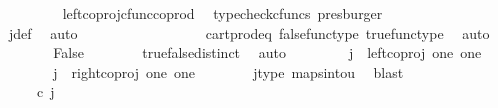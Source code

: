 \begin{isabellebody}
\ \ \ \ \ \ \isamarkupfalse%
\ \ left{\isacharunderscore}{\kern0pt}coproj{\isacharunderscore}{\kern0pt}cfunc{\isacharunderscore}{\kern0pt}coprod\ \isamarkupfalse%
\ {\isacharparenleft}{\kern0pt}typecheck{\isacharunderscore}{\kern0pt}cfuncs{\isacharcomma}{\kern0pt}\ presburger{\isacharparenright}{\kern0pt}\isanewline
\ \ \ \ \isamarkupfalse%
\ \isamarkupfalse%
\ {\isachardoublequoteopen}{\isasymlangle}{\isasymf}{\isacharcomma}{\kern0pt}{\isasymt}{\isasymrangle}\ {\isacharequal}{\kern0pt}\ {\isasymlangle}{\isasymt}{\isacharcomma}{\kern0pt}{\isasymt}{\isasymrangle}{\isachardoublequoteclose}\isanewline
\ \ \ \ \ \ \isamarkupfalse%
\ j{\isacharunderscore}{\kern0pt}def\ \isamarkupfalse%
\ auto\isanewline
\ \ \ \ \isamarkupfalse%
\ \isamarkupfalse%
\ {\isachardoublequoteopen}{\isasymt}\ {\isacharequal}{\kern0pt}\ {\isasymf}{\isachardoublequoteclose}\isanewline
\ \ \ \ \ \ \isamarkupfalse%
\ cart{\isacharunderscore}{\kern0pt}prod{\isacharunderscore}{\kern0pt}eq{}\ false{\isacharunderscore}{\kern0pt}func{\isacharunderscore}{\kern0pt}type\ true{\isacharunderscore}{\kern0pt}func{\isacharunderscore}{\kern0pt}type\ \isamarkupfalse%
\ auto\isanewline
\ \ \ \ \isamarkupfalse%
\ \isamarkupfalse%
\ False\isanewline
\ \ \ \ \ \ \isamarkupfalse%
\ true{\isacharunderscore}{\kern0pt}false{\isacharunderscore}{\kern0pt}distinct\ \isamarkupfalse%
\ auto\isanewline
\ \ \isamarkupfalse%
\isanewline
\ \ \ \ \isamarkupfalse%
\ {\isachardoublequoteopen}j\ {\isasymnoteq}\ left{\isacharunderscore}{\kern0pt}coproj\ one\ one{\isachardoublequoteclose}\isanewline
\ \ \ \ \isamarkupfalse%
\ \isamarkupfalse%
\ {\isachardoublequoteopen}j\ {\isacharequal}{\kern0pt}\ right{\isacharunderscore}{\kern0pt}coproj\ one\ one{\isachardoublequoteclose}\isanewline
\ \ \ \ \ \ \isamarkupfalse%
\ j{\isacharunderscore}{\kern0pt}type\ maps{\isacharunderscore}{\kern0pt}into{\isacharunderscore}{\kern0pt}{}u{}\ \isamarkupfalse%
\ blast\isanewline
\ \ \ \ \isamarkupfalse%
\ \isamarkupfalse%
\ {\isachardoublequoteopen}{\isacharparenleft}{\kern0pt}{\isasymlangle}{\isasymt}{\isacharcomma}{\kern0pt}\ {\isasymt}{\isasymrangle}\ {\isasymamalg}{\isasymlangle}{\isasymf}{\isacharcomma}{\kern0pt}\ {\isasymf}{\isasymrangle}{\isacharparenright}{\kern0pt}\ {\isasymcirc}\isactrlsub c\ j\ \ {\isacharequal}{\kern0pt}\ {\isasymlangle}{\isasymf}{\isacharcomma}{\kern0pt}\ {\isasymf}{\isasymrangle}{\isachardoublequoteclose}\isanewline

\end{isabellebody}
